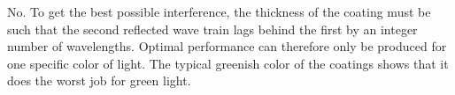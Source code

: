 No. To get the best possible interference, the thickness of the
coating must be such that the second reflected wave train lags behind
the first by an integer number of wavelengths. Optimal performance
can therefore only be produced for one specific color of light. The
typical greenish color of the coatings shows that it does the worst
job for green light.
